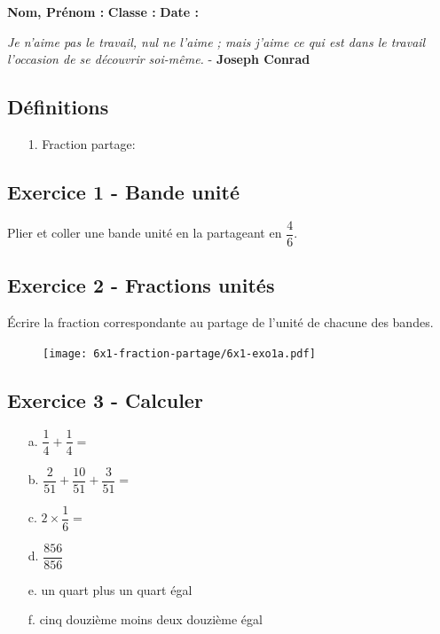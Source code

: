 



\textbf{Nom, Prénom :} \hspace{8cm} \textbf{Classe :} \hspace{3cm} \textbf{Date :}\\
\vspace{-0.8cm}
\begin{center}
  \textit{Je n'aime pas le travail, nul ne l'aime ; mais j'aime ce qui est dans le travail l'occasion de se découvrir soi-même.}  - \textbf{Joseph Conrad}
\end{center}
\vspace{-0.8cm}

\subsection*{Définitions}
  \begin{enumerate}
    \item[1.] Fraction partage: \dotfill \\
    \Pointilles[1]
  \end{enumerate}

  \vspace{-1cm}

\subsection*{Exercice 1 - Bande unité}

Plier et coller une bande unité en la partageant en $\dfrac{4}{6}$.

\vspace{2cm}

\subsection*{Exercice 2 - Fractions unités}

Écrire la fraction correspondante au partage de l'unité de chacune des bandes. 

\begin{figure}[H]
    \centering
    \texttt{[image: 6x1-fraction-partage/6x1-exo1a.pdf]}
  \end{figure}


\subsection*{Exercice 3 - Calculer}

\begin{enumerate}
    \item[a.] $\dfrac{1}{4} + \dfrac{1}{4} = $ \dotfill
    \item[b.] $\dfrac{2}{51} + \dfrac{10}{51} + \dfrac{3}{51} = $ \dotfill
    \item[c.] $2 \times \dfrac{1}{6} = $ \dotfill
    \item[d.] $\dfrac{856}{856}$ \dotfill
    \item[e.] un quart plus un quart égal \dotfill
    \item[f.] cinq douzième moins deux douzième égal \dotfill
 \end{enumerate}


